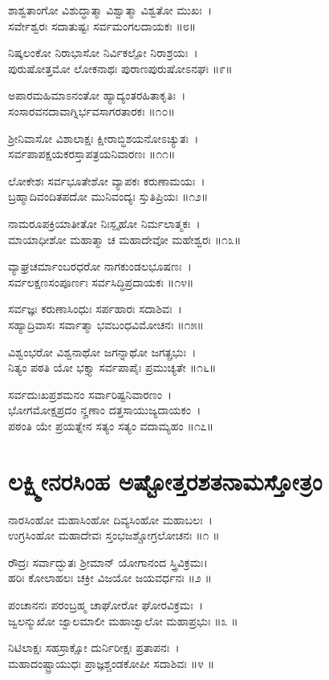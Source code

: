 ಶಾಶ್ವತಾಂಗೋ ವಿಶುದ್ಧಾತ್ಮಾ ವಿಶ್ವಾತ್ಮಾ ವಿಶ್ವತೋ ಮುಖಃ~।\\
ಸರ್ವೇಶ್ವರಃ ಸದಾತುಷ್ಟಃ ಸರ್ವಮಂಗಲದಾಯಕಃ ॥೮॥

ನಿಷ್ಕಲಂಕೋ ನಿರಾಭಾಸೋ ನಿರ್ವಿಕಲ್ಪೋ ನಿರಾಶ್ರಯಃ~।\\
ಪುರುಷೋತ್ತಮೋ ಲೋಕನಾಥಃ ಪುರಾಣಪುರುಷೋಽನಘಃ ॥೯॥

ಅಪಾರಮಹಿಮಾಽನಂತೋ ಹ್ಯಾದ್ಯಂತರಹಿತಾಕೃತಿಃ~।\\
ಸಂಸಾರವನದಾವಾಗ್ನಿರ್ಭವಸಾಗರತಾರಕಃ ॥೧೦॥

ಶ್ರೀನಿವಾಸೋ ವಿಶಾಲಾಕ್ಷಃ ಕ್ಷೀರಾಬ್ಧಿಶಯನೋಽಚ್ಯುತಃ~।\\
ಸರ್ವಪಾಪಕ್ಷಯಕರಸ್ತಾಪತ್ರಯನಿವಾರಣಃ ॥೧೧॥

ಲೋಕೇಶಃ ಸರ್ವಭೂತೇಶೋ ವ್ಯಾಪಕಃ ಕರುಣಾಮಯಃ~।\\
ಬ್ರಹ್ಮಾದಿವಂದಿತಪದೋ ಮುನಿವಂದ್ಯಃ ಸ್ತುತಿಪ್ರಿಯಃ ॥೧೨॥

ನಾಮರೂಪಕ್ರಿಯಾತೀತೋ ನಿಃಸ್ಪೃಹೋ ನಿರ್ಮಲಾತ್ಮಕಃ~।\\
ಮಾಯಾಧೀಶೋ ಮಹಾತ್ಮಾ ಚ ಮಹಾದೇವೋ ಮಹೇಶ್ವರಃ ॥೧೩॥

ವ್ಯಾಘ್ರಚರ್ಮಾಂಬರಧರೋ ನಾಗಕುಂಡಲಭೂಷಣಃ~।\\
ಸರ್ವಲಕ್ಷಣಸಂಪೂರ್ಣಃ ಸರ್ವಸಿದ್ಧಿಪ್ರದಾಯಕಃ ॥೧೪॥

ಸರ್ವಜ್ಞಃ ಕರುಣಾಸಿಂಧುಃ ಸರ್ಪಹಾರಃ ಸದಾಶಿವಃ~।\\
ಸಹ್ಯಾದ್ರಿವಾಸಃ ಸರ್ವಾತ್ಮಾ ಭವಬಂಧವಿಮೋಚನಃ ॥೧೫॥

ವಿಶ್ವಂಭರೋ ವಿಶ್ವನಾಥೋ ಜಗನ್ನಾಥೋ ಜಗತ್ಪ್ರಭುಃ~।\\
ನಿತ್ಯಂ ಪಠತಿ ಯೋ ಭಕ್ತ್ಯಾ ಸರ್ವಪಾಪೈಃ ಪ್ರಮುಚ್ಯತೇ ॥೧೬॥

ಸರ್ವದುಃಖಪ್ರಶಮನಂ ಸರ್ವಾರಿಷ್ಟನಿವಾರಣಂ~।\\
ಭೋಗಮೋಕ್ಷಪ್ರದಂ ನೄಣಾಂ ದತ್ತಸಾಯುಜ್ಯದಾಯಕಂ~।\\
ಪಠಂತಿ ಯೇ ಪ್ರಯತ್ನೇನ ಸತ್ಯಂ ಸತ್ಯಂ ವದಾಮ್ಯಹಂ ॥೧೭॥

\section{ಲಕ್ಷ್ಮೀನರಸಿಂಹ ಅಷ್ಟೋತ್ತರಶತನಾಮಸ್ತೋತ್ರಂ}
ನಾರಸಿಂಹೋ ಮಹಾಸಿಂಹೋ ದಿವ್ಯಸಿಂಹೋ ಮಹಾಬಲಃ~।\\
ಉಗ್ರಸಿಂಹೋ ಮಹಾದೇವಃ ಸ್ತಂಭಜಶ್ಚೋಗ್ರಲೋಚನಃ ॥೧ ॥

ರೌದ್ರಃ ಸರ್ವಾದ್ಭುತಃ ಶ್ರೀಮಾನ್ ಯೋಗಾನಂದ ಸ್ತ್ರಿವಿಕ್ರಮಃ।\\
ಹರಿಃ ಕೋಲಾಹಲಃ ಚಕ್ರೀ ವಿಜಯೋ ಜಯವರ್ಧನಃ ॥೨ ॥

ಪಂಚಾನನಃ ಪರಂಬ್ರಹ್ಮ ಚಾಘೋರೋ ಘೋರವಿಕ್ರಮಃ~।\\
ಜ್ವಲನ್ಮುಖೋ ಜ್ವಾಲಮಾಲೀ ಮಹಾಜ್ವಾಲೋ ಮಹಾಪ್ರಭುಃ ॥೩ ॥

ನಿಟಿಲಾಕ್ಷಃ ಸಹಸ್ರಾಕ್ಷೋ ದುರ್ನಿರೀಕ್ಷಃ ಪ್ರತಾಪನಃ~।\\
ಮಹಾದಂಷ್ಟ್ರಾಯುಧಃ ಪ್ರಾಜ್ಞಶ್ಚಂಡಕೋಪೀ ಸದಾಶಿವಃ ॥೪ ॥

